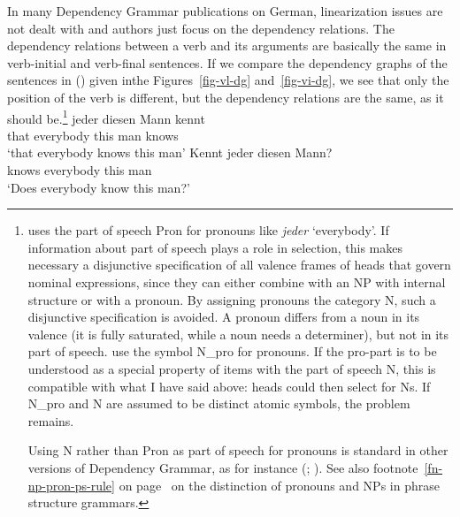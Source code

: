 \largerpage[-1]
In many Dependency Grammar publications on German, linearization issues are not dealt with and
authors just focus on the dependency relations. The dependency relations between a verb
and its arguments are basically the same in verb-initial and verb-final sentences. If we compare the
dependency graphs of the sentences in () given in\pagebreak[4] the Figures~\ref{fig-vl-dg} and~\ref{fig-vi-dg}, we see that only the position of the verb is
different, but the dependency relations are the same, as it should be.\footnote{
  \citet{Eroms2000a} uses the part of speech Pron for pronouns like \emph{jeder}
  `everybody'. If information about part of speech plays a role in selection, this makes necessary a
  disjunctive specification of all valence frames of heads that govern nominal expressions, since
  they can either combine with an NP with internal structure or with a pronoun. By assigning
  pronouns the category N, such a disjunctive specification is avoided. A pronoun differs from a noun
  in its valence (it is fully saturated, while a noun needs a determiner), but not in its part of
  speech. \citet[]{EH2003a} use the symbol N\_pro for pronouns. If the pro-part is to be understood as
  a special property of items with the part of speech N, this is compatible with what I have said
  above: heads could then select for Ns. If N\_pro and N are assumed to be distinct atomic symbols,
  the problem remains.

  Using N rather than Pron as part of speech for pronouns is standard in other versions of
  Dependency Grammar, as for instance \wg (\citealp[]{Hudson90a-u}; \citealp[]{Hudson2007a-u}).
  See also footnote~\ref{fn-np-pron-ps-rule} on page~\pageref{fn-np-pron-ps-rule} on the distinction
  of pronouns and NPs in phrase structure grammars.%
}
\eal
\ex
\gll [dass] jeder diesen Mann kennt\\
     \spacebr{}that everybody this man knows\\
\glt `that everybody knows this man'
\ex
\gll Kennt jeder diesen Mann?\\
     knows everybody this man\\
\glt `Does everybody know this man?'
\zl

